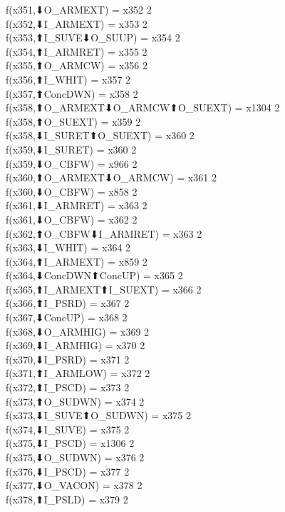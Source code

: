 f(x351,⬇O_ARMEXT) = x352 {2} \\
f(x352,⬇I_ARMEXT) = x353 {2} \\
f(x353,⬆I_SUVE⬇O_SUUP) = x354 {2} \\
f(x354,⬆I_ARMRET) = x355 {2} \\
f(x355,⬆O_ARMCW) = x356 {2} \\
f(x356,⬆I_WHIT) = x357 {2} \\
f(x357,⬆ConcDWN) = x358 {2} \\
f(x358,⬆O_ARMEXT⬇O_ARMCW⬆O_SUEXT) = x1304 {2} \\
f(x358,⬆O_SUEXT) = x359 {2} \\
f(x358,⬇I_SURET⬆O_SUEXT) = x360 {2} \\
f(x359,⬇I_SURET) = x360 {2} \\
f(x359,⬇O_CBFW) = x966 {2} \\
f(x360,⬆O_ARMEXT⬇O_ARMCW) = x361 {2} \\
f(x360,⬇O_CBFW) = x858 {2} \\
f(x361,⬇I_ARMRET) = x363 {2} \\
f(x361,⬇O_CBFW) = x362 {2} \\
f(x362,⬆O_CBFW⬇I_ARMRET) = x363 {2} \\
f(x363,⬇I_WHIT) = x364 {2} \\
f(x364,⬆I_ARMEXT) = x859 {2} \\
f(x364,⬇ConcDWN⬆ConcUP) = x365 {2} \\
f(x365,⬆I_ARMEXT⬆I_SUEXT) = x366 {2} \\
f(x366,⬆I_PSRD) = x367 {2} \\
f(x367,⬇ConcUP) = x368 {2} \\
f(x368,⬇O_ARMHIG) = x369 {2} \\
f(x369,⬇I_ARMHIG) = x370 {2} \\
f(x370,⬇I_PSRD) = x371 {2} \\
f(x371,⬆I_ARMLOW) = x372 {2} \\
f(x372,⬆I_PSCD) = x373 {2} \\
f(x373,⬆O_SUDWN) = x374 {2} \\
f(x373,⬇I_SUVE⬆O_SUDWN) = x375 {2} \\
f(x374,⬇I_SUVE) = x375 {2} \\
f(x375,⬇I_PSCD) = x1306 {2} \\
f(x375,⬇O_SUDWN) = x376 {2} \\
f(x376,⬇I_PSCD) = x377 {2} \\
f(x377,⬇O_VACON) = x378 {2} \\
f(x378,⬆I_PSLD) = x379 {2} \\
